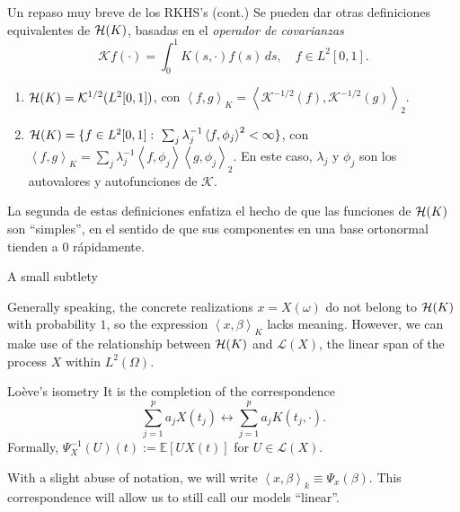 \documentclass[10pt, english, professionalfonts]{beamer}
\newcommand\maroon[1]{\color{mLightBrown}#1\color{mDarkTeal}}
\newcommand{\E}{\mathbb{E}}
\newcommand{\Hcal}{\ensuremath\mathcal{H}}
\newcommand\dotprod[2]{\left\langle #1, #2 \right\rangle}
\begin{document}
\begin{frame}{Un repaso muy breve de los RKHS's (cont.)}
Se pueden dar otras definiciones equivalentes de \(\Hcal(K)\), basadas en el \textit{operador de covarianzas}
\[
\mathcal Kf(\cdot) = \int_0^1 K(s, \cdot)f(s)\, ds, \quad f\in L^2[0, 1].
\]

\begin{definition}
\begin{enumerate}
  \item  \(\Hcal(K) = \mathcal K^{1/2}(L^2[0, 1])\), con \(\dotprod{f}{g}_K = \dotprod{\mathcal K^{-1/2}(f)}{\mathcal K^{-1/2}(g)}_2\).
  \item \(\Hcal(K) = \{f \in L^2[0, 1]: \ \sum_j \lambda_j^{-1}\dotprod{f}{\phi_j}^2 < \infty \}\), con \(\dotprod{f}{g}_K = \sum_j \lambda_j^{-1}\dotprod{f}{\phi_j}\dotprod{g}{\phi_j}_2\). En este caso, \(\lambda_j\) y \(\phi_j\) son los autovalores y autofunciones de \(\mathcal K\).
\end{enumerate}
\end{definition}

La segunda de estas definiciones enfatiza el hecho de que las funciones de \(\Hcal(K)\) son ``simples'', en el sentido de que sus componentes en una base ortonormal tienden a \(0\) rápidamente.

\end{frame}

\begin{frame}{A small subtlety}

  Generally speaking, the concrete realizations \(x=X(\omega)\) \maroon{do not belong to \(\Hcal(K)\) with probability \(1\)}, so the expression \(\dotprod{x}{\beta}_K\) lacks meaning. However, we can make use of the relationship between \(\Hcal(K)\) and \(\mathcal L(X)\), the linear span of the process \(X\) within \(L^2(\Omega)\).


  \vspace{1em}
  \begin{block}{Loève's isometry}
    It is the completion of the correspondence
    \[
\sum_{j=1}^p a_j X(t_j) \longleftrightarrow \sum_{j=1}^p a_j K(t_j, \cdot).
    \]
    Formally, \(\Psi^{-1}_X(U)(t) := \E[U X(t)]\) for \(U \in \mathcal L(X)\).
  \end{block}
  With a slight abuse of notation, we will write \maroon{\(\dotprod{x}{\beta}_k \equiv \Psi_x(\beta)\)}. This correspondence will allow us to still call our models ``linear''.
\end{frame}
\end{document}
